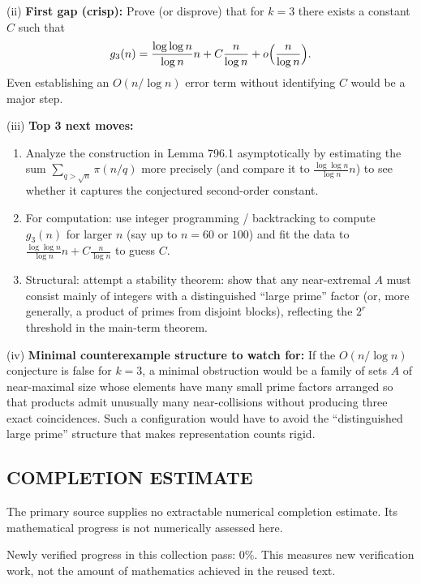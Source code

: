 (ii) \textbf{First gap (crisp):} Prove (or disprove) that for $k=3$ there exists a constant $C$ such that
\[
 g_3(n)=\frac{\log\log n}{\log n}n + C\frac{n}{\log n}+o\Bigl(\frac{n}{\log n}\Bigr).
\]
Even establishing an $O(n/\log n)$ error term without identifying $C$ would be a major step.

(iii) \textbf{Top 3 next moves:}
\begin{enumerate}
\item Analyze the construction in Lemma 796.1 asymptotically by estimating the sum $\sum_{q>\sqrt n} \pi(n/q)$ more precisely (and compare it to $\frac{\log\log n}{\log n}n$) to see whether it captures the conjectured second-order constant.
\item For computation: use integer programming / backtracking to compute $g_3(n)$ for larger $n$ (say up to $n=60$ or $100$) and fit the data to $\frac{\log\log n}{\log n}n + C\frac{n}{\log n}$ to guess $C$.
\item Structural: attempt a stability theorem: show that any near-extremal $A$ must consist mainly of integers with a distinguished ``large prime'' factor (or, more generally, a product of primes from disjoint blocks), reflecting the $2^r$ threshold in the main-term theorem.
\end{enumerate}

(iv) \textbf{Minimal counterexample structure to watch for:} If the $O(n/\log n)$ conjecture is false for $k=3$, a minimal obstruction would be a family of sets $A$ of near-maximal size whose elements have many small prime factors arranged so that products admit unusually many near-collisions without producing three exact coincidences. Such a configuration would have to avoid the ``distinguished large prime'' structure that makes representation counts rigid.



\subsection*{COMPLETION ESTIMATE}
The primary source supplies no extractable numerical completion estimate. Its mathematical progress is not numerically assessed here.

Newly verified progress in this collection pass: $0\%$. This measures new verification work, not the amount of mathematics achieved in the reused text.
